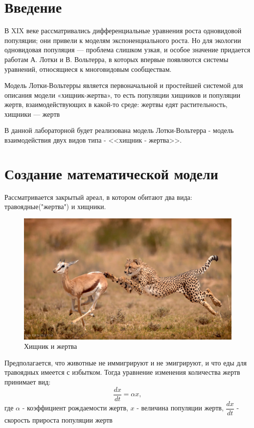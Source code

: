 \documentclass[a4paper, 14pt]{extarticle}
\begin{document}
	\pagebreak	

	\section{Введение}
		В XIX веке рассматривались дифференциальные уравнения роста одновидовой популяции; они привели к моделям 		экспоненциального роста. Но для экологии одновидовая популяция — проблема слишком узкая, и особое значение придается работам А. Лотки и В. Вольтерра, в которых впервые появляются системы уравнений, относящиеся к многовидовым сообществам.
		
		Модель Лотки-Вольтерры является первоначальной и простейшей системой для описания модели «хищник-жертва», то есть популяции хищников и популяции жертв, взаимодействующих в какой-то среде: жертвы едят растительность, хищники — жертв
		
		В данной лабораторной будет реализована модель Лотки-Вольтерра - модель взаимодействия двух видов типа - <<хищник - жертва>>.
	\pagebreak
	\section{Создание математической модели}
		Рассматривается закрытый ареал, в котором обитают два вида: травоядные("жертва") и хищники. 
		\begin{figure}[H]
			\centering
			\includegraphics[width = \linewidth] {1.jpg}
			\caption[.] {Хищник и жертва}
		\end{figure}
		Предполагается, что животные не иммигрируют и не эмигрируют, и
		что еды для травоядных имеется с избытком. Тогда уравнение изменения количества жертв принимает вид:
			\[ \dfrac{dx}{dt} = \alpha x,\]
		где $\alpha$ - коэффициент рождаемости жертв, $x$ - величина популяции жертв, $\dfrac{dx}{dt}$ - скорость прироста популяции жертв
\end{document}
